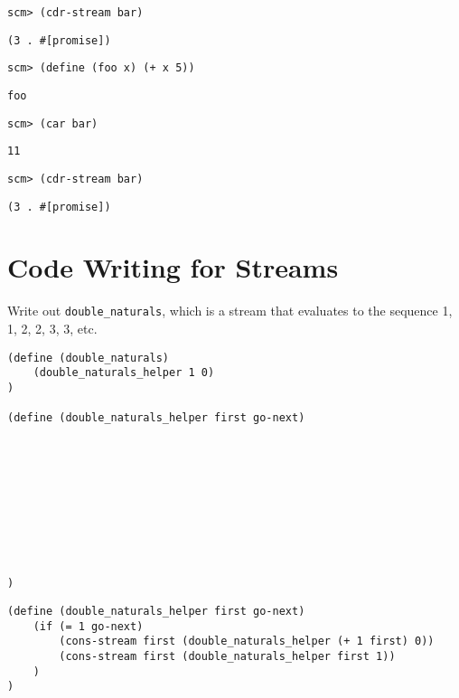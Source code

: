 \documentclass{exam}
\begin{document}
\begin{questions}
\begin{blocksection}
\begin{lstlisting}
scm> (cdr-stream bar)
\end{lstlisting}
\begin{solution}[.35in]
\begin{lstlisting}
(3 . #[promise])
\end{lstlisting}
\end{solution}

\begin{lstlisting}
scm> (define (foo x) (+ x 5))
\end{lstlisting}
\begin{solution}[.35in]
\texttt{foo}
\end{solution}

\begin{lstlisting}
scm> (car bar)
\end{lstlisting}
\begin{solution}[.35in]
\texttt{11}
\end{solution}

\begin{lstlisting}
scm> (cdr-stream bar)
\end{lstlisting}
\begin{solution}[.35in]
\begin{lstlisting}
(3 . #[promise])
\end{lstlisting}
\end{solution}

\end{blocksection}

\section{Code Writing for Streams}

\begin{blocksection}
\question Write out \texttt{double\_naturals}, which is a stream that evaluates to the sequence 1, 1, 2, 2, 3, 3, etc.
\begin{lstlisting}
(define (double_naturals)
    (double_naturals_helper 1 0)
)

(define (double_naturals_helper first go-next)










)

\end{lstlisting}

\begin{solution}
\begin{lstlisting}
(define (double_naturals_helper first go-next)
    (if (= 1 go-next)
        (cons-stream first (double_naturals_helper (+ 1 first) 0))
        (cons-stream first (double_naturals_helper first 1))
    )
)


\end{lstlisting}
\end{solution}
\end{blocksection}
\end{questions}
\end{document}
